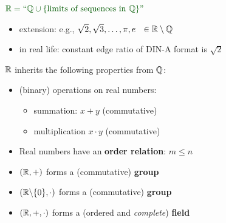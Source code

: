 {\begin{frame}
\vspace{0.5cm}
$\color{defgruen} \R = \text{``}\Q \cup \{\text{limits of sequences in } \Q\} \text{''}$
\vspace{0.5cm}
\begin{itemize}
\item extension: e.g., $\sqrt{2}, \sqrt{3},\ldots, \pi, e ~~\in{\mathbb{R}}\setminus{\mathbb{Q}}$
\item in real life: constant edge ratio of DIN-A format is $\sqrt{2}$
\end{itemize}
\vspace{0.5cm}
${\mathbb{R}}$ inherits the following properties from ${\mathbb{Q}}$: \\\vspace{0.2cm}
\begin{itemize}
\item (binary) operations on real numbers:
\begin{itemize} \normalsize
	\item summation: $x+y$ (commutative)
	\item multiplication $x \cdot y$ (commutative)
\end{itemize}
\item Real numbers have an \textbf{order relation}: $m\le n$ \vspace{0.2cm}
\item $({\mathbb{R}}, +)$ forms a (commutative) \textbf{group} \vspace{0.2cm}
\item $({\mathbb{R}} \backslash \{0\}, \cdot)$ forms a (commutative) \textbf{group} \vspace{0.2cm}
\item $({\mathbb{R}},+, \cdot)$ forms a (ordered and \textit{complete}) \textbf{field} \vspace{0.2cm}
\end{itemize}
\end{frame}
}



